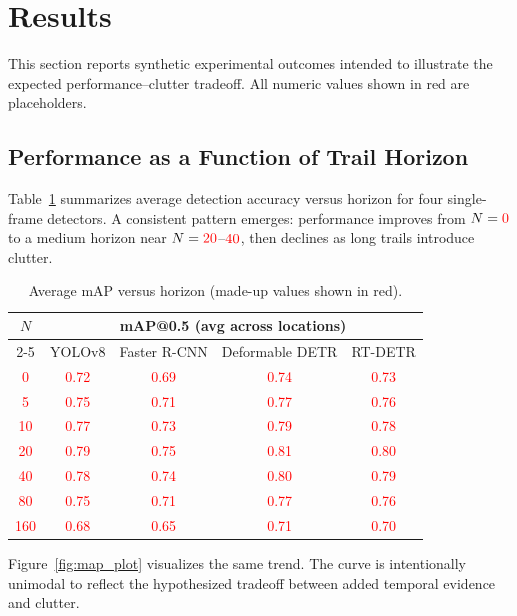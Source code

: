 \documentclass[twocolumn, 10pt]{article}
\newcommand{\ph}[1]{\textcolor{red}{#1}}
\begin{document}
\section{Results}
This section reports synthetic experimental outcomes intended to illustrate the expected performance--clutter tradeoff. All numeric values shown in red are placeholders.

\subsection{Performance as a Function of Trail Horizon}
Table~\ref{tab:map_curve} summarizes average detection accuracy versus horizon for four single-frame detectors. A consistent pattern emerges: performance improves from $N=\ph{0}$ to a medium horizon near $N=\ph{20}$--$\ph{40}$, then declines as long trails introduce clutter.

\begin{table}[t]
\centering
\caption{Average mAP versus horizon (made-up values shown in red).}
\label{tab:map_curve}
\begin{tabular}{@{}ccccc@{}}
\toprule
\multirow{2}{*}{$N$} & \multicolumn{4}{c}{mAP@0.5 (avg across locations)} \\
\cmidrule(lr){2-5}
 & YOLOv8 & Faster R-CNN & Deformable DETR & RT-DETR \\
\midrule
\ph{0}   & \ph{0.72} & \ph{0.69} & \ph{0.74} & \ph{0.73} \\
\ph{5}   & \ph{0.75} & \ph{0.71} & \ph{0.77} & \ph{0.76} \\
\ph{10}  & \ph{0.77} & \ph{0.73} & \ph{0.79} & \ph{0.78} \\
\ph{20}  & \ph{0.79} & \ph{0.75} & \ph{0.81} & \ph{0.80} \\
\ph{40}  & \ph{0.78} & \ph{0.74} & \ph{0.80} & \ph{0.79} \\
\ph{80}  & \ph{0.75} & \ph{0.71} & \ph{0.77} & \ph{0.76} \\
\ph{160} & \ph{0.68} & \ph{0.65} & \ph{0.71} & \ph{0.70} \\
\bottomrule
\end{tabular}
\end{table}

Figure~\ref{fig:map_plot} visualizes the same trend. The curve is intentionally unimodal to reflect the hypothesized tradeoff between added temporal evidence and clutter.
\end{document}
